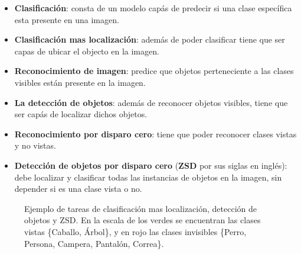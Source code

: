 \begin{itemize}
	\item \textbf{Clasificación}: consta de un modelo capás de predecir si una clase específica esta presente en una imagen. 
	\item \textbf{Clasificación mas localización}: además de poder clasificar tiene que ser capas de ubicar el objecto en la imagen.
	\item \textbf{Reconocimiento de imagen}: predice que objetos perteneciente a las clases visibles están presente en la imagen. 
	\item \textbf{La detección de objetos}: además de reconocer objetos visibles, tiene que ser capás de localizar dichos objetos. 
	\item \textbf{Reconocimiento por disparo cero}: tiene que poder reconocer clases vistas y no vistas.
	\item \textbf{Detección de objetos por disparo cero} (\textbf{ZSD} por sus siglas en inglés): debe localizar y clasificar todas las instancias de objetos en la imagen, sin depender si es una clase vista o no.
\end{itemize}

\begin{figure}[]
  \centering
  \hspace{1em}%
  \caption{Ejemplo de tareas de clasificación mas localización, detección de objetos y ZSD. En la escala de los verdes se encuentran las clases vistas \{Caballo, Árbol\}, y en rojo las clases invisibles \{Perro, Persona, Campera, Pantalón, Correa\}.}
  \label{fig:DetectoresYSZD}
\end{figure}

